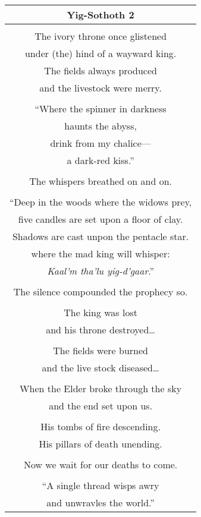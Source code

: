 \documentclass{article}
\begin{document}
\begin{center}
\begin{tabular}{c}
\textbf{Yig-Sothoth 2} \\ \hline
\\
The ivory throne once glistened \\
under (the) hind of a wayward king. \\
The fields always produced \\
and the livestock were merry. \\
\\
``Where the spinner in darkness \\
haunts the abyss, \\
drink from my chalice--- \\
a dark-red kiss.'' \\
\\
The whispers breathed on and on. \\
\\
``Deep in the woods where the widows prey, \\
five candles are set upon a floor of clay. \\
Shadows are cast unpon the pentacle star. \\
where the mad king will whisper: \\
\textit{Kaal'm tha'lu yig-d'gaar}.'' \\
\\
The silence compounded the prophecy so. \\
\\
The king was lost \\
and his throne destroyed\ldots{} \\
\\
The fields were burned \\
and the live stock diseased\ldots{} \\
\\
When the Elder broke through the sky \\
and the end set upon us. \\
\\
His tombs of fire descending. \\
His pillars of death unending. \\
\\
Now we wait for our deaths to come. \\
\\
``A single thread wisps awry \\
and unwravles the world.'' \\
\end{tabular}
\end{center}
\end{document}
